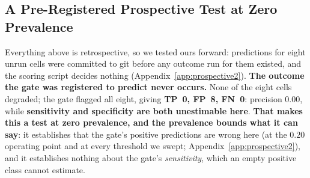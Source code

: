 \subsection{A Pre-Registered Prospective Test at Zero Prevalence}
\label{sec:analysis:prospective}
Everything above is retrospective, so we tested ours forward: predictions for eight unrun
cells were committed to git before any outcome run for them existed, and the
scoring script decides nothing (Appendix~\ref{app:prospective2}).
\textbf{The outcome the gate was registered to predict never occurs.}  None of
the eight cells degraded; the gate flagged all eight, giving \textbf{TP~0, FP~8,
FN~0}: precision $0.00$, while \textbf{sensitivity and specificity are both
unestimable here}.  \textbf{That makes this a test at zero prevalence, and the
prevalence bounds what it can say}: it establishes that the gate's positive
predictions are wrong here (at the $0.20$ operating point and at every threshold
we swept; Appendix~\ref{app:prospective2}), and it establishes nothing
about the gate's \emph{sensitivity}, which an
empty positive class cannot estimate.
